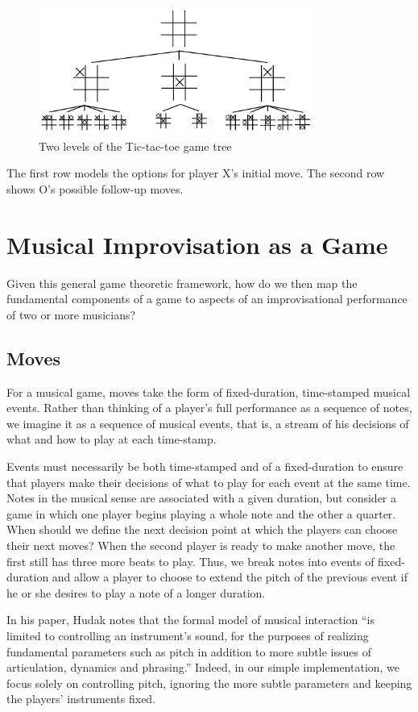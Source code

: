 \documentclass{article}
\begin{document}
\begin{figure}
\centering
\includegraphics[width=90mm]{ttt.jpg}
\caption{Two levels of the Tic-tac-toe game tree}
\end{figure}

The first row models the options for player X's initial move.  The second row 
shows O's possible follow-up moves.

\section{Musical Improvisation as a
Game}

Given this general game theoretic framework, how do we then map the
fundamental components of a game to aspects of an improvisational
performance of two or more musicians?

\subsection{Moves}
For a musical game, moves take the form of fixed-duration, time-stamped
musical events\cite{hudakberger95}. Rather than thinking of a player's full performance as a
sequence of notes, we imagine it as a sequence of musical events, that
is, a stream of his decisions of what and how to play at each
time-stamp.

Events must necessarily be both time-stamped and of a fixed-duration to
ensure that players make their decisions of what to play for each event
at the same time. Notes in the musical sense are associated with a given
duration, but consider a game in which one player begins playing a whole
note and the other a quarter.  When should we define the next decision
point at which the players can choose their next moves? When the second
player is ready to make another move, the first still has three more
beats to play. Thus, we break notes into events of fixed-duration and
allow a player to choose to extend the pitch of the previous event if he
or she desires to play a note of a longer duration.

In his paper, Hudak notes that the formal model of musical interaction
``is limited to controlling an instrument's sound, for the purposes of
realizing fundamental parameters such as pitch in addition to more
subtle issues of articulation, dynamics and phrasing.'' Indeed, in our
simple implementation, we focus solely on controlling pitch, ignoring
the more subtle parameters and keeping the players' instruments fixed.
\end{document}
